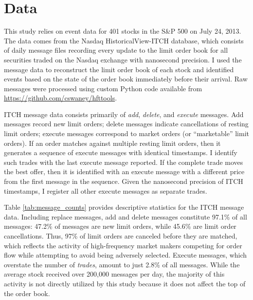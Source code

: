 \section{Data}
	This study relies on event data for 401 stocks in the S\&P 500 on July 24, 2013. The data comes from the Nasdaq HistoricalView-ITCH database, which consists of daily message files recording every update to the limit order book for all securities traded on the Nasdaq exchange with nanosecond precision. I used the message data to reconstruct the limit order book of each stock and identified events based on the state of the order book immediately before their arrival. Raw messages were processed using custom Python code available from \url{https://github.com/cswaney/hfttools}.

	ITCH message data consists primarily of \textit{add}, \textit{delete}, and \textit{execute} messages. Add messages record new limit orders; delete messages indicate cancellations of resting limit orders; execute messages correspond to market orders (or ``marketable'' limit orders). If an order matches against multiple resting limit orders, then it generates a sequence of execute messages with identical timestamps. I identify such trades with the last execute message reported. If the complete trade moves the best offer, then it is identified with an execute message with a different price from the first message in the sequence. Given the nanosecond precision of ITCH timestamps, I register all other execute messages as separate trades.

	Table \ref{tab:message_counts} provides descriptive statistics for the ITCH message data. Including replace messages, add and delete messages constitute 97.1\% of all messages: 47.2\% of messages are new limit orders, while 45.6\% are limit order cancellations. Thus, 97\% of limit orders are canceled before they are matched, which reflects the activity of high-frequency market makers competing for order flow while attempting to avoid being adversely selected. Execute messages, which overstate the number of \textit{trades}, amount to just 2.8\% of all messages. While the average stock received over 200,000 messages per day, the majority of this activity is not directly utilized by this study because it does not affect the top of the order book.

